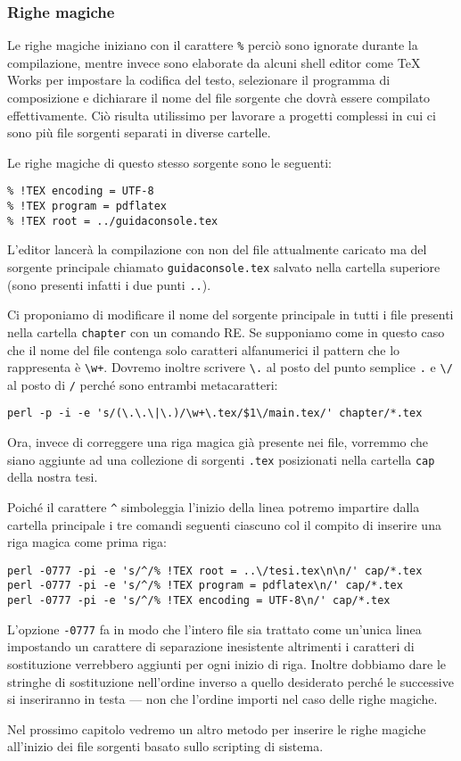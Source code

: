 \subsubsection{Righe magiche}

Le righe magiche iniziano con il carattere \texttt{\%} perciò sono ignorate
durante la compilazione, mentre invece sono elaborate da alcuni shell editor
come TeX Works per impostare la codifica del testo, selezionare il programma di
composizione e dichiarare il nome del file sorgente che dovrà essere compilato
effettivamente. Ciò risulta utilissimo per lavorare a progetti complessi in cui
ci sono più file sorgenti separati in diverse cartelle.

Le righe magiche di questo stesso sorgente sono le seguenti:
\begin{verbatim}
% !TEX encoding = UTF-8
% !TEX program = pdflatex
% !TEX root = ../guidaconsole.tex
\end{verbatim}
L'editor lancerà la compilazione con  non del file attualmente
caricato ma del sorgente principale chiamato \texttt{guidaconsole.tex} salvato
nella cartella superiore (sono presenti infatti i due punti \texttt{..}).

Ci proponiamo di modificare il nome del sorgente principale in tutti i file
presenti nella cartella \texttt{chapter} con un comando RE. Se supponiamo come
in questo caso che il nome del file contenga solo caratteri alfanumerici il
pattern che lo rappresenta è \texttt{\textbackslash w+}. Dovremo inoltre
scrivere \texttt{\textbackslash .} al posto del punto semplice \texttt{.} e
\texttt{\textbackslash /} al posto di \texttt{/} perché sono entrambi
metacaratteri:
\begin{Verbatim}[fontsize=\small]
perl -p -i -e 's/(\.\.\|\.)/\w+\.tex/$1\/main.tex/' chapter/*.tex
\end{Verbatim}

Ora, invece di correggere una riga magica già presente nei file, vorremmo che
siano aggiunte ad una collezione di sorgenti \texttt{.tex} posizionati nella
cartella \texttt{cap} della nostra tesi.

Poiché il carattere \verb=^= simboleggia l'inizio della linea potremo
impartire dalla cartella principale i tre comandi seguenti ciascuno col il
compito di inserire una riga magica come prima riga:
\begin{Verbatim}[fontsize=\small]
perl -0777 -pi -e 's/^/% !TEX root = ..\/tesi.tex\n\n/' cap/*.tex
perl -0777 -pi -e 's/^/% !TEX program = pdflatex\n/' cap/*.tex
perl -0777 -pi -e 's/^/% !TEX encoding = UTF-8\n/' cap/*.tex
\end{Verbatim}

L'opzione \texttt{-0777} fa in modo che l'intero file sia trattato come
un'unica linea impostando un carattere di separazione inesistente altrimenti i
caratteri di sostituzione verrebbero aggiunti per ogni inizio di riga. Inoltre
dobbiamo dare le stringhe di sostituzione nell'ordine inverso a quello
desiderato perché le successive si inseriranno in testa --- non che l'ordine
importi nel caso delle righe magiche.

Nel prossimo capitolo vedremo un altro metodo per inserire le righe magiche
all'inizio dei file sorgenti basato sullo scripting di sistema.

